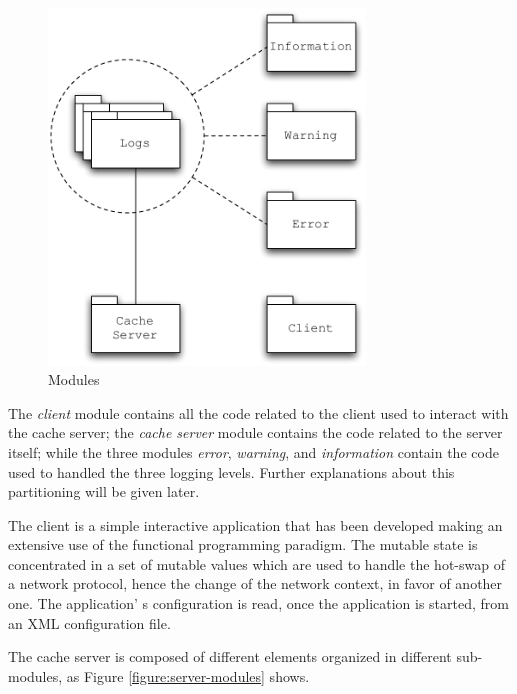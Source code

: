 \documentclass[11pt,a4paper]{article}
\begin{document}
\begin{figure}
\begin{center}
\includegraphics[width=0.75\textwidth]{figures/Modules.pdf}
\caption{Modules}
\label{figure:modules}
\end{center}
\end{figure}

The \textit{client} module contains all the code related to the client used to interact with the cache server; the \textit{cache server} module contains the code related to the server itself; while the three modules \textit{error}, \textit{warning}, and \textit{information} contain the code used to handled the three logging levels. Further explanations about this partitioning will be given later.

The client is a simple interactive application that has been developed making an extensive use of the functional programming paradigm. The mutable state is concentrated in a set of mutable values which are used to handle the hot-swap of a network protocol, hence the change of the network context, in favor of another one. The application' s configuration is read, once the application is started, from an XML configuration file.

The cache server is composed of different elements organized in different sub-modules, as Figure \ref{figure:server-modules} shows.
\end{document}
